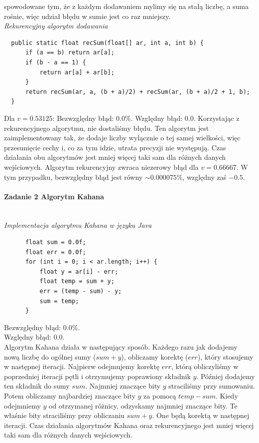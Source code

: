 \documentclass[12pt,a4paper]{article}
\begin{document}
  spowodowane tym, że z każdym dodawaniem mylimy się na stałą liczbę, a suma
  rośnie, więc udział błędu w sumie jest co raz mniejszy.\vspace{3mm}\\
  \emph{Rekurencyjny algorytm dodawania}
  \begin{Verbatim}
  public static float recSum(float[] ar, int a, int b) {
      if (a == b) return ar[a];
      if (b - a == 1) {
          return ar[a] + ar[b];
      }
      return recSum(ar, a, (b + a)/2) + recSum(ar, (b + a)/2 + 1, b);
  }
  \end{Verbatim}
  Dla $v = 0.53125$: \newline
  Bezwzględny błąd: $ 0.0 \% $. \newline
  Względny błąd: $ 0.0 $. \newline
  Korzystając z rekurencyjnego algorytmu, nie dostaliśmy błędu. Ten algorytm
  jest zaimplementowany tak, że dodaje liczby wylącznie o tej samej wielkości,
  więc przesunięcie cechy i, co za tym idzie, utrata precyzji nie występują.
  \newline
  Czas działania obu algorytmów jest mniej więcej taki sam dla różnych danych
  wejściowych. \newline
  Algorytm rekurencyjny zwraca niezerowy błąd dla $v = 0.66667$. W tym przypadku,
  bezwzględny błąd jest równy $ \sim 0.000075 \% $, względny zaś $ -0.5 $. \newline
  \paragraph{Zadanie 2 Algorytm Kahana}\mbox{}\vspace{3mm}\\
  \emph{Implementacja algorytmu Kahana w języku Java}
  \begin{Verbatim}
      float sum = 0.0f;
      float err = 0.0f;
      for (int i = 0; i < ar.length; i++) {
          float y = ar[i] - err;
          float temp = sum + y;
          err = (temp - sum) - y;
          sum = temp;
      }
  \end{Verbatim}
  Bezwzględny błąd: $ 0.0 \%$. \\
  Względny błąd: $ 0.0 $. \\
  Algorytm Kahana działa w następujący sposób. Każdego razu jak dodajemy
  nową liczbę do ogólnej sumy ($sum + y$), obliczamy korektę ($err$),
  który stosujemy w następnej iteracji. Najpierw odejmujemy korektę $err$,
  którą obliczyliśmy w poprzedniej iteracji pętli i otrzymujemy poprawiony
  składnik $y$. Później dodajemy ten składnik do sumy $sum$. Najmniej znaczące
  bity $y$ straciliśmy przy sumowaniu. Potem obliczamy najbardziej znaczące
  bity $y$ za pomocą $temp - sum$. Kiedy odejmniemy $y$ od otrzymanej różnicy,
  odzyskamy najmniej znaczące bity. Te właśnie bity straciliśmy przy obliczaniu
  $sum + y$. One będą korektą w następnej iteracji. \newline
  Czas działania algorytmów Kahana oraz rekurencyjnego jest mniej więcej taki
  sam dla różnych danych wejściowych.
\end{document}
